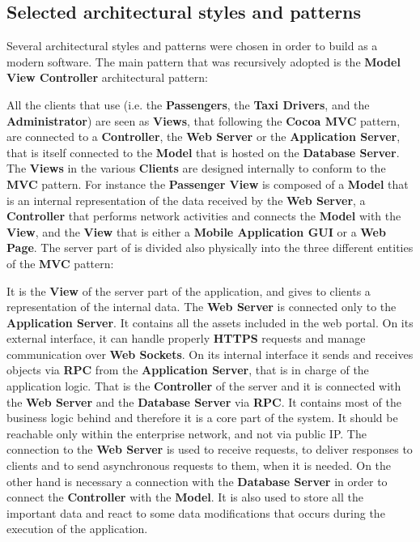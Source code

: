 \subsection{Selected architectural styles and patterns}
Several architectural styles and patterns were chosen in order to build \myTaxiService{} as a modern software.
The main pattern that was recursively adopted is the \textbf{Model View Controller} architectural pattern:
\begin{itemize}
	 All the clients that use \myTaxiService{} (i.e. the \textbf{Passengers}, the \textbf{Taxi Drivers}, and the \textbf{Administrator}) are seen as \textbf{Views}, that following the \textbf{Cocoa MVC} pattern, are connected to a \textbf{Controller}, the \textbf{Web Server} or the \textbf{Application Server}, that is itself connected to the \textbf{Model} that is hosted on the \textbf{Database Server}.
	 The \textbf{Views} in the various \textbf{Clients} are designed internally to conform to the \textbf{MVC} pattern. For instance the \textbf{Passenger View} is composed of a \textbf{Model} that is an internal representation of the data received by the \textbf{Web Server}, a \textbf{Controller} that performs network activities and connects the \textbf{Model} with the \textbf{View}, and the \textbf{View} that is either a \textbf{Mobile Application GUI} or a \textbf{Web Page}.
	 The server part of \myTaxiService{} is divided also physically into the three different entities of the \textbf{MVC} pattern:
	\begin{itemize}
		 It is the \textbf{View} of the server part of the application, and gives to clients a representation of the internal data. The \textbf{Web Server} is connected only to the \textbf{Application Server}. It contains all the assets included in the web portal. On its external interface, it can handle properly \textbf{HTTPS} requests and manage communication over \textbf{Web Sockets}. On its internal interface it sends and receives objects via \textbf{RPC} from the \textbf{Application Server}, that is in charge of the application logic.
		 That is the \textbf{Controller} of the server and it is connected with the \textbf{Web Server} and the \textbf{Database Server} via \textbf{RPC}. It contains most of the business logic behind \myTaxiService{} and therefore it is a core part of the system. It should be reachable only within the enterprise network, and not via public IP. The connection to the \textbf{Web Server} is used to receive requests, to deliver responses to clients and to send asynchronous requests to them, when it is needed. On the other hand is necessary a connection with the \textbf{Database Server} in order to connect the \textbf{Controller} with the \textbf{Model}. It is also used to store all the important data and react to some data modifications that occurs during the execution of the application.

\end{itemize}
\end{itemize}
